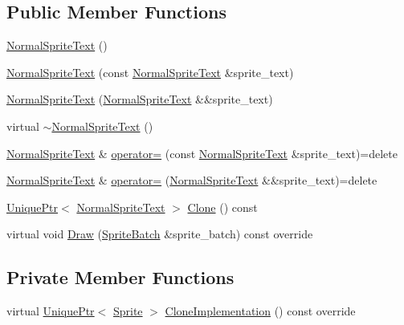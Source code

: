 \subsection*{Public Member Functions}
\begin{DoxyCompactItemize}
\item 
\hyperlink{classmage_1_1_normal_sprite_text_a1e932ddea2c5b96b0dc500c8cd7f09a7}{Normal\+Sprite\+Text} ()
\item 
\hyperlink{classmage_1_1_normal_sprite_text_aa73a83a29b28d7b5f20240f3074e5d4d}{Normal\+Sprite\+Text} (const \hyperlink{classmage_1_1_normal_sprite_text}{Normal\+Sprite\+Text} \&sprite\+\_\+text)
\item 
\hyperlink{classmage_1_1_normal_sprite_text_ab2b8232a1bb1aa5294eaa335cb0ccd97}{Normal\+Sprite\+Text} (\hyperlink{classmage_1_1_normal_sprite_text}{Normal\+Sprite\+Text} \&\&sprite\+\_\+text)
\item 
virtual \hyperlink{classmage_1_1_normal_sprite_text_ae8575ab8ece5b8b923509fc7ab4d3dea}{$\sim$\+Normal\+Sprite\+Text} ()
\item 
\hyperlink{classmage_1_1_normal_sprite_text}{Normal\+Sprite\+Text} \& \hyperlink{classmage_1_1_normal_sprite_text_ab7dbd2e71dcaef5d6b7b767afa8d7094}{operator=} (const \hyperlink{classmage_1_1_normal_sprite_text}{Normal\+Sprite\+Text} \&sprite\+\_\+text)=delete
\item 
\hyperlink{classmage_1_1_normal_sprite_text}{Normal\+Sprite\+Text} \& \hyperlink{classmage_1_1_normal_sprite_text_a54cb023fad3b66dba35854ceaa50bc44}{operator=} (\hyperlink{classmage_1_1_normal_sprite_text}{Normal\+Sprite\+Text} \&\&sprite\+\_\+text)=delete
\item 
\hyperlink{namespacemage_a3316d7143a973e37adf1110f2e80ca31}{Unique\+Ptr}$<$ \hyperlink{classmage_1_1_normal_sprite_text}{Normal\+Sprite\+Text} $>$ \hyperlink{classmage_1_1_normal_sprite_text_a8357ea517cff639204da4825024d9d34}{Clone} () const
\item 
virtual void \hyperlink{classmage_1_1_normal_sprite_text_ad2a1b02bea18afd6bf61b106a727a355}{Draw} (\hyperlink{classmage_1_1_sprite_batch}{Sprite\+Batch} \&sprite\+\_\+batch) const override
\end{DoxyCompactItemize}
\subsection*{Private Member Functions}
\begin{DoxyCompactItemize}
\item 
virtual \hyperlink{namespacemage_a3316d7143a973e37adf1110f2e80ca31}{Unique\+Ptr}$<$ \hyperlink{classmage_1_1_sprite}{Sprite} $>$ \hyperlink{classmage_1_1_normal_sprite_text_acab5b61f8be4a475cd54b51278956e37}{Clone\+Implementation} () const override
\end{DoxyCompactItemize}

